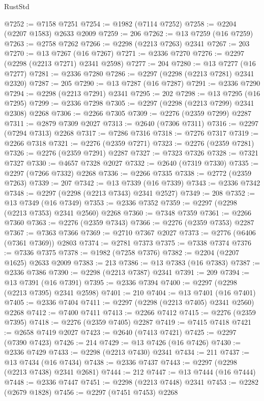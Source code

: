 \begin{lexlean}{RustStd}
\begin{coremodule}
{\begin{coremodule}
{{{{{{{{{{{{{{{{{{{{{{{{{{{{{{{{{{{{{{{{{{{{{{{{{{{{{{@7252 := @7158 @7251
@7254 := @1982 (@7114 @7252)
@7258 := @2204 (@2207 @1583) @2633 @2009
@7259 := 206
@7262 := @13 @7259 (@16 @7259)
@7263 := @2758 @7262
@7266 := @2298 (@2213 @7263) @2341
@7267 := 203
@7270 := @13 @7267 (@16 @7267)
@7271 := @2336 @7270
@7276 := @2297 (@2298 (@2213 @7271) @2341 @2598)
@7277 := 204
@7280 := @13 @7277 (@16 @7277)
@7281 := @2336 @7280
@7286 := @2297 (@2298 (@2213 @7281) @2341 @2320)
@7287 := 205
@7290 := @13 @7287 (@16 @7287)
@7291 := @2336 @7290
@7294 := @2298 (@2213 @7291) @2341
@7295 := 202
@7298 := @13 @7295 (@16 @7295)
@7299 := @2336 @7298
@7305 := @2297 (@2298 (@2213 @7299) @2341 @2308) @2268
@7306 := @2266 @7305
@7309 := @2276 (@2359 @7299) @2287
@7311 := @2879 @7309 @2027
@7313 := @2640 (@7306 @7311)
@7316 := @2297 (@7294 @7313) @2268
@7317 := @7286 @7316
@7318 := @7276 @7317
@7319 := @2266 @7318
@7321 := @2276 (@2359 @7271)
@7323 := @2276 (@2359 @7281)
@7326 := @2276 (@2359 @7291) @2287
@7327 := @7323 @7326
@7328 := @7321 @7327
@7330 := @4657 @7328 @2027
@7332 := @2640 (@7319 @7330)
@7335 := @2297 (@7266 @7332) @2268
@7336 := @2266 @7335
@7338 := @2772 (@2359 @7263)
@7339 := 207
@7342 := @13 @7339 (@16 @7339)
@7343 := @2336 @7342
@7348 := @2297 (@2298 (@2213 @7343) @2341 @2527)
@7349 := 208
@7352 := @13 @7349 (@16 @7349)
@7353 := @2336 @7352
@7359 := @2297 (@2298 (@2213 @7353) @2341 @2560) @2268
@7360 := @7348 @7359
@7361 := @2266 @7360
@7363 := @2276 (@2359 @7343)
@7366 := @2276 (@2359 @7353) @2287
@7367 := @7363 @7366
@7369 := @2710 @7367 @2027
@7373 := @2776 (@6406 (@7361 @7369)) @2803
@7374 := @2781 @7373
@7375 := @7338 @7374
@7376 := @7336 @7375
@7378 := @1982 (@7258 @7376)
@7382 := @2204 (@2207 @1625) @2633 @2009
@7383 := 213
@7386 := @13 @7383 (@16 @7383)
@7387 := @2336 @7386
@7390 := @2298 (@2213 @7387) @2341
@7391 := 209
@7394 := @13 @7391 (@16 @7391)
@7395 := @2336 @7394
@7400 := @2297 (@2298 (@2213 @7395) @2341 @2598)
@7401 := 210
@7404 := @13 @7401 (@16 @7401)
@7405 := @2336 @7404
@7411 := @2297 (@2298 (@2213 @7405) @2341 @2560) @2268
@7412 := @7400 @7411
@7413 := @2266 @7412
@7415 := @2276 (@2359 @7395)
@7418 := @2276 (@2359 @7405) @2287
@7419 := @7415 @7418
@7421 := @2658 @7419 @2027
@7423 := @2640 (@7413 @7421)
@7425 := @2297 (@7390 @7423)
@7426 := 214
@7429 := @13 @7426 (@16 @7426)
@7430 := @2336 @7429
@7433 := @2298 (@2213 @7430) @2341
@7434 := 211
@7437 := @13 @7434 (@16 @7434)
@7438 := @2336 @7437
@7443 := @2297 (@2298 (@2213 @7438) @2341 @2681)
@7444 := 212
@7447 := @13 @7444 (@16 @7444)
@7448 := @2336 @7447
@7451 := @2298 (@2213 @7448) @2341
@7453 := @2282 (@2679 @1828)
@7456 := @2297 (@7451 @7453) @2268
}}}}}}}}}}}}}}}}}}}}}}}}}}}}}}}}}}}}}}}}}}}}}}}}}}}}}}
\end{coremodule}}
\end{coremodule}
\end{lexlean}
